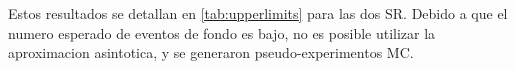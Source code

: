Estos resultados se detallan en \cref{tab:upperlimits} para las dos SR. Debido a que el
numero esperado de eventos de fondo es bajo, no es posible utilizar la aproximacion asintotica,
y se generaron pseudo-experimentos MC.



